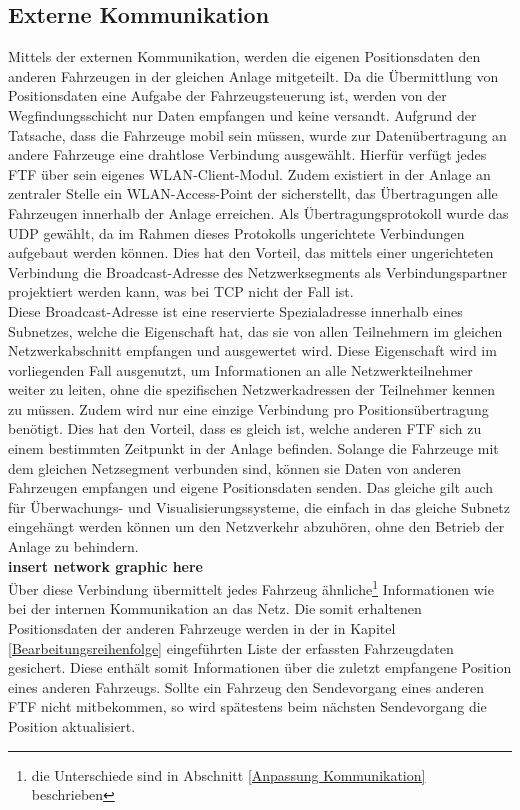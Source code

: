 	\subsection{Externe Kommunikation}
		\label{Externe Kommunikation}
		Mittels der externen Kommunikation, werden die eigenen Positionsdaten den anderen Fahrzeugen in der gleichen Anlage mitgeteilt. Da die Übermittlung von Positionsdaten eine Aufgabe der Fahrzeugsteuerung ist, werden von der Wegfindungsschicht nur Daten empfangen und keine versandt. Aufgrund der Tatsache, dass die Fahrzeuge mobil sein müssen, wurde zur Datenübertragung an andere Fahrzeuge eine drahtlose Verbindung ausgewählt. Hierfür verfügt jedes \ac{FTF} über sein eigenes \acs{WLAN}-Client-Modul. Zudem existiert in der Anlage an zentraler Stelle ein \acs{WLAN}-Access-Point der sicherstellt, das Übertragungen alle Fahrzeugen innerhalb der Anlage erreichen. Als Übertragungsprotokoll wurde das \ac{UDP} gewählt, da im Rahmen dieses Protokolls ungerichtete Verbindungen aufgebaut werden können. Dies hat den Vorteil, das mittels einer ungerichteten Verbindung die Broadcast-Adresse des Netzwerksegments als Verbindungspartner projektiert werden kann, was bei \ac{TCP} nicht der Fall ist.
		\\
		Diese Broadcast-Adresse ist eine reservierte Spezialadresse innerhalb eines Subnetzes, welche die Eigenschaft hat, das sie von allen Teilnehmern im gleichen Netzwerkabschnitt empfangen und ausgewertet wird. Diese Eigenschaft wird im vorliegenden Fall ausgenutzt, um Informationen an alle Netzwerkteilnehmer weiter zu leiten, ohne die spezifischen Netzwerkadressen der Teilnehmer kennen zu müssen. Zudem wird nur eine einzige Verbindung pro Positionsübertragung benötigt. Dies hat den Vorteil, dass es gleich ist, welche anderen \ac{FTF} sich zu einem bestimmten Zeitpunkt in der Anlage befinden. Solange die Fahrzeuge mit dem gleichen Netzsegment verbunden sind, können sie Daten von anderen Fahrzeugen empfangen und eigene Positionsdaten senden. Das gleiche gilt auch für Überwachungs- und Visualisierungssysteme, die einfach in das gleiche Subnetz eingehängt werden können um den Netzverkehr abzuhören, ohne den Betrieb der Anlage zu behindern.
		\\
		\textbf{insert network graphic here}
		\\
		Über diese Verbindung übermittelt jedes Fahrzeug ähnliche\footnote{die Unterschiede sind in Abschnitt \ref{Anpassung Kommunikation} beschrieben} Informationen wie bei der internen Kommunikation an das Netz. Die somit erhaltenen Positionsdaten der anderen Fahrzeuge werden in der in Kapitel \ref{Bearbeitungsreihenfolge} eingeführten Liste der erfassten Fahrzeugdaten gesichert. Diese enthält somit Informationen über die zuletzt empfangene Position eines anderen Fahrzeugs. Sollte ein Fahrzeug den Sendevorgang eines anderen \ac{FTF} nicht mitbekommen, so wird spätestens beim nächsten Sendevorgang die Position aktualisiert.
		
